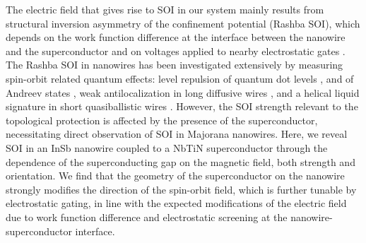 The electric field that gives rise to SOI in our system mainly results from structural inversion asymmetry of the confinement potential (Rashba SOI), which depends on the work function difference at the interface between the nanowire and the superconductor and on voltages applied to nearby electrostatic gates \cite{Vuik2016,Antipov2018,Woods2018,Mikkelsen2018}.
The Rashba SOI in nanowires has been investigated extensively by measuring spin-orbit related quantum effects: level repulsion of quantum dot levels \cite{Fasth2007,NadjPerge2012}, and of Andreev states \cite{DeMoor2018,Deng2016}, weak antilocalization in long \mbox{diffusive} wires \cite{Hansen2005,VanWeperen2015}, and a helical liquid signature in short quasiballistic wires \cite{JakobHelical}.
However, the SOI strength relevant to the topological protection is affected by the \mbox{presence} of the superconductor, necessitating direct observation of SOI in Majorana nanowires.
Here, we reveal SOI in an InSb nanowire coupled to a NbTiN superconductor through the dependence of the superconducting gap on the magnetic field, both strength and orientation.
We find that the geometry of the superconductor on the nanowire strongly modifies the direction of the spin-orbit field, which is further tunable by electrostatic gating, in line with the expected modifications of the electric field due to work function difference and electrostatic screening at the nanowire-superconductor interface.

